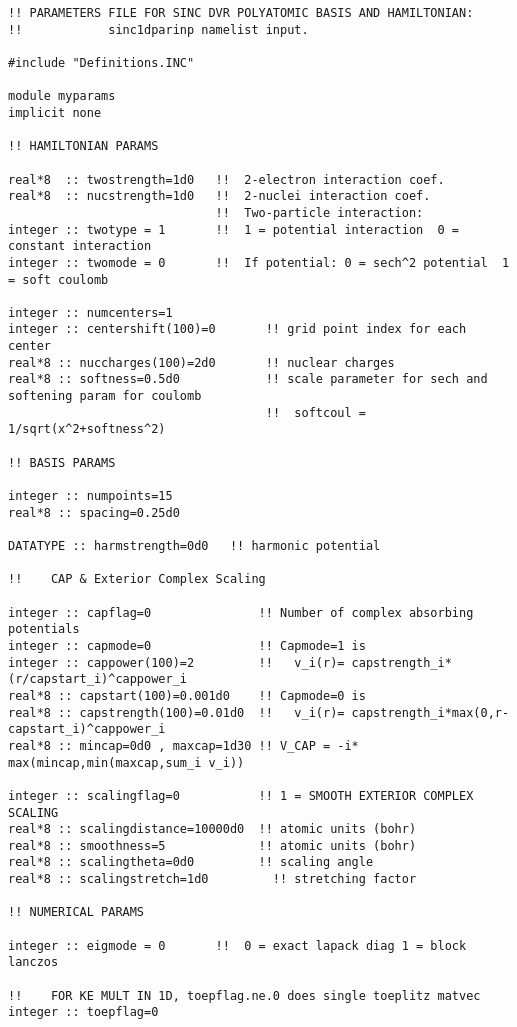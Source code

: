 \begin{verbatim}
!! PARAMETERS FILE FOR SINC DVR POLYATOMIC BASIS AND HAMILTONIAN:
!!            sinc1dparinp namelist input.

#include "Definitions.INC"

module myparams
implicit none

!! HAMILTONIAN PARAMS

real*8  :: twostrength=1d0   !!  2-electron interaction coef.
real*8  :: nucstrength=1d0   !!  2-nuclei interaction coef.
                             !!  Two-particle interaction:
integer :: twotype = 1       !!  1 = potential interaction  0 = constant interaction
integer :: twomode = 0       !!  If potential: 0 = sech^2 potential  1 = soft coulomb

integer :: numcenters=1
integer :: centershift(100)=0       !! grid point index for each center
real*8 :: nuccharges(100)=2d0       !! nuclear charges
real*8 :: softness=0.5d0            !! scale parameter for sech and softening param for coulomb
                                    !!  softcoul = 1/sqrt(x^2+softness^2)

!! BASIS PARAMS

integer :: numpoints=15
real*8 :: spacing=0.25d0

DATATYPE :: harmstrength=0d0   !! harmonic potential

!!    CAP & Exterior Complex Scaling

integer :: capflag=0               !! Number of complex absorbing potentials
integer :: capmode=0               !! Capmode=1 is 
integer :: cappower(100)=2         !!   v_i(r)= capstrength_i*(r/capstart_i)^cappower_i
real*8 :: capstart(100)=0.001d0    !! Capmode=0 is    
real*8 :: capstrength(100)=0.01d0  !!   v_i(r)= capstrength_i*max(0,r-capstart_i)^cappower_i
real*8 :: mincap=0d0 , maxcap=1d30 !! V_CAP = -i* max(mincap,min(maxcap,sum_i v_i))

integer :: scalingflag=0           !! 1 = SMOOTH EXTERIOR COMPLEX SCALING
real*8 :: scalingdistance=10000d0  !! atomic units (bohr)
real*8 :: smoothness=5             !! atomic units (bohr)
real*8 :: scalingtheta=0d0         !! scaling angle
real*8 :: scalingstretch=1d0         !! stretching factor

!! NUMERICAL PARAMS

integer :: eigmode = 0       !!  0 = exact lapack diag 1 = block lanczos

!!    FOR KE MULT IN 1D, toepflag.ne.0 does single toeplitz matvec
integer :: toepflag=0


\end{verbatim}
